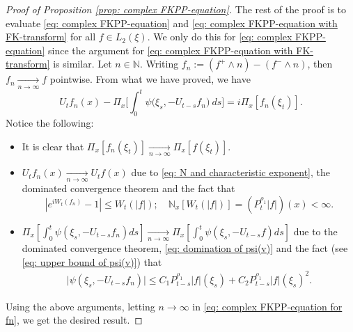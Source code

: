 \documentclass[12pt,a4paper]{amsart}
\theoremstyle{plain}
\theoremstyle{definition}
\numberwithin{equation}{section}
\begin{document}
\begin{proof}[Proof of Proposition \ref{prop: complex FKPP-equation}]
    The rest of the proof is to evaluate \eqref{eq: complex FKPP-equation} and \eqref{eq: complex FKPP-equation with FK-transform} for all $f\in L_2(\xi)$. We only do this for \eqref{eq: complex FKPP-equation} since the argument for \eqref{eq: complex FKPP-equation with FK-transform} is similar.
    Let $n \in \mathbb N$.
    Writing $f_n := (f^+ \wedge n) - (f^- \wedge n)$, then $f_n \xrightarrow[n\to \infty]{} f$ pointwise.
    From what we have proved, we have
\begin{equation}
\label{eq: complex FKPP-equation for fn}
    U_tf_n(x) - \Pi_{x} \Big[\int_0^t \psi\big(\xi_s, - U_{t-s}f_n\big) ~ds\Big]
    = i \Pi_{x} [f_n(\xi_t)].
\end{equation}
    Notice the following:
\begin{itemize}
\item
    It is clear that $\Pi_{x}[f_n(\xi_t)] \xrightarrow[n\to \infty]{} \Pi_{x}[f(\xi_t)]$.
\item
    $U_tf_n(x) \xrightarrow[n\to \infty]{} U_tf(x)$ due to \eqref{eq: N and characteristic exponent}, the dominated convergence theorem and the fact that
\[
    |e^{i W_t(f_n)} - 1| \leq W_t(|f|);
    \quad \mathbb N_x[W_t(|f|)] = (P_t^{\rho_1} |f|)(x) < \infty.
\]
\item
    $\Pi_{x} [\int_0^t \psi(\xi_s,- U_{t-s}f_n)ds] \xrightarrow[n\to \infty]{} \Pi_{x} [\int_0^t \psi(\xi_s,- U_{t-s}f)ds]$ due to the dominated convergence theorem, \eqref{eq: domination of psi(v)} and the fact (see \eqref{eq: upper bound of psi(v)}) that
\begin{equation}\begin{split}
    \big|\psi(\xi_s,- U_{t-s}f_n)\big|
    \leq C_1 P_{t-s}^{\rho_1}|f|(\xi_s)+C_2 P_{t-s}^{\rho_1}|f|(\xi_s)^2.
\end{split}\end{equation}
\end{itemize}
    Using the above arguments, letting $n \to \infty$ in \eqref{eq: complex FKPP-equation for fn}, we get the desired result.
\end{proof}

%
%
\end{document}
